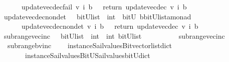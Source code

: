 \begin{isabellebody}
\ \ \ \ \ {\isachardoublequoteopen}\ update{\isacharunderscore}vec{\isacharunderscore}dec{\isacharunderscore}fail\ v\ i\ b\ {\isacharequal}\ {\isacharparenleft}\ return\ {\isacharparenleft}update{\isacharunderscore}vec{\isacharunderscore}dec\ v\ i\ b{\isacharparenright}{\isacharparenright}{\isachardoublequoteclose}\isanewline
\isanewline
{}\isamarkupfalse%
\ update{\isacharunderscore}vec{\isacharunderscore}dec{\isacharunderscore}nondet\ \ {\isacharcolon}{\isacharcolon}\ {\isachardoublequoteopen}{\isacharparenleft}bitU{\isacharparenright}list\ {\isasymRightarrow}\ int\ {\isasymRightarrow}\ bitU\ {\isasymRightarrow}{\isacharparenleft}{\isacharprime}b{\isacharcomma}{\isacharparenleft}{\isacharparenleft}bitU{\isacharparenright}list{\isacharparenright}{\isacharcomma}{\isacharprime}a{\isacharparenright}monad\ {\isachardoublequoteclose}\ \ \ \isanewline
\ \ \ \ \ {\isachardoublequoteopen}\ update{\isacharunderscore}vec{\isacharunderscore}dec{\isacharunderscore}nondet\ v\ i\ b\ {\isacharequal}\ {\isacharparenleft}\ return\ {\isacharparenleft}update{\isacharunderscore}vec{\isacharunderscore}dec\ v\ i\ b{\isacharparenright}{\isacharparenright}{\isachardoublequoteclose}\isanewline
\isanewline
\isanewline
%
\isanewline
{}\isamarkupfalse%
\ subrange{\isacharunderscore}vec{\isacharunderscore}inc\ \ {\isacharcolon}{\isacharcolon}\ {\isachardoublequoteopen}{\isacharparenleft}bitU{\isacharparenright}list\ {\isasymRightarrow}\ int\ {\isasymRightarrow}\ int\ {\isasymRightarrow}{\isacharparenleft}bitU{\isacharparenright}list\ {\isachardoublequoteclose}\ \ \ \isanewline
\ \ \ \ \ {\isachardoublequoteopen}\ subrange{\isacharunderscore}vec{\isacharunderscore}inc\ {\isacharequal}\ {\isacharparenleft}\ \isanewline
\ \ subrange{\isacharunderscore}bv{\isacharunderscore}inc\isanewline
\ \ \ \ {\isacharparenleft}instance{\isacharunderscore}Sail{}{\isacharunderscore}values{\isacharunderscore}Bitvector{\isacharunderscore}list{\isacharunderscore}dict\isanewline
\ \ \ \ \ \ \ instance{\isacharunderscore}Sail{}{\isacharunderscore}values{\isacharunderscore}BitU{\isacharunderscore}Sail{}{\isacharunderscore}values{\isacharunderscore}bitU{\isacharunderscore}dict{\isacharparenright}\ {\isacharparenright}{\isachardoublequoteclose}\isanewline
\isanewline

\end{isabellebody}
